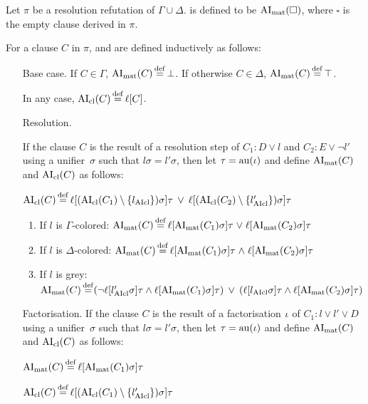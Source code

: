 \documentclass[,%
	draft=false,%
	numbers=noendperiod
	11pt,
	a4paper,
	oneside,%
	openany,
]{memoir}
\begin{document}


\begin{defi}
	Let $\pi$ be a resolution refutation of $\Gamma \cup \Delta$.
	 is defined to be $\operatorname{AI}_\mathrm{mat}(\square)$, where $\square$ is the empty clause derived in $\pi$.

	For a clause $C$ in $\pi$,  and  are defined inductively as follows:
	\begin{itemize}
		\item[Base case.]
			If $C \in \Gamma$, $\operatorname{AI}_\mathrm{mat}(C) \operatorname{\stackrel{\mathrm{def}}{=}} \bot$.
			If otherwise $C \in \Delta$, $\operatorname{AI}_\mathrm{mat}(C) \operatorname{\stackrel{\mathrm{def}}{=}} \top$.

			In any case, $\operatorname{AI}_\mathrm{cl}(C) \operatorname{\stackrel{\mathrm{def}}{=}} \ell[C]$.
		\item[Resolution.]

			If the clause $C$ is the result of a resolution step \inference{} of $C_1: D \lor l$ and $C_2: E \lor \lnot l'$ using a unifier~$\sigma$ such that $l\sigma = l'\sigma$, 
			then 
			let $\tau = \operatorname{au}(\iota)$ and  
			define $\operatorname{AI}_\mathrm{mat}(C)$ and $\operatorname{AI}_\mathrm{cl}(C)$ as follows:

			$\operatorname{AI}_\mathrm{cl}(C) \operatorname{\stackrel{\mathrm{def}}{=}} \ell[(\operatorname{AI}_\mathrm{cl}(C_1) \setminus \{l_{\operatorname{AIcl}}\})\sigma]\tau \;\,{\lor}\;\, \ell[(\operatorname{AI}_\mathrm{cl}(C_2)\setminus \{l_{\operatorname{AIcl}}'\})\sigma]\tau $
			\begin{enumerate}

				\item If $l$ is $\Gamma$-colored:
					$\operatorname{AI}_\mathrm{mat}(C) \operatorname{\stackrel{\mathrm{def}}{=}} \ell[\operatorname{AI}_\mathrm{mat}(C_1)\sigma]\tau\;{\lor}\; \ell[\operatorname{AI}_\mathrm{mat}(C_2)\sigma]\tau $

				\item If $l$ is $\Delta$-colored:
					$\operatorname{AI}_\mathrm{mat}(C) \operatorname{\stackrel{\mathrm{def}}{=}} \ell[\operatorname{AI}_\mathrm{mat}(C_1)\sigma]\tau\;{\land}\; \ell[\operatorname{AI}_\mathrm{mat}(C_2)\sigma]\tau $

				\item If $l$ is grey:
					$\operatorname{AI}_\mathrm{mat}(C) \operatorname{\stackrel{\mathrm{def}}{=}}
					(\lnot {\ell[l'\ensuremath{_{\operatorname{AIcl}}}\sigma]}\tau \land \ell[\operatorname{AI}_\mathrm{mat}(C_1)\sigma]\tau) \;\,{\lor}\;\,
					(\ell[l_{\operatorname{AIcl}}\sigma]\tau \land \ell[\operatorname{AI}_\mathrm{mat}(C_2)\sigma]\tau)
					$

			\end{enumerate}

		\item[Factorisation.]
			If the clause $C$ is the result of a factorisation $\iota$ of $C_1: l \lor l' \lor D$ using a unifier~$\sigma$ such that $l\sigma = l'\sigma$,
			then let $\tau = \operatorname{au}(\iota)$ and define 
			$\operatorname{AI}_\mathrm{mat}(C)$ and $\operatorname{AI}_\mathrm{cl}(C)$ as follows:

			$\operatorname{AI}_\mathrm{mat}(C) \operatorname{\stackrel{\mathrm{def}}{=}}{} \ell[\operatorname{AI}_\mathrm{mat}(C_1)\sigma]\tau$

			$\AIcl(C) \defeq \lifboth{ (\AIclause(C_1) \setminus\nolinebreak \{l'\cl\})\sigma}\tau$
			\qedhere

	\end{itemize}
\end{defi}
\end{document}
